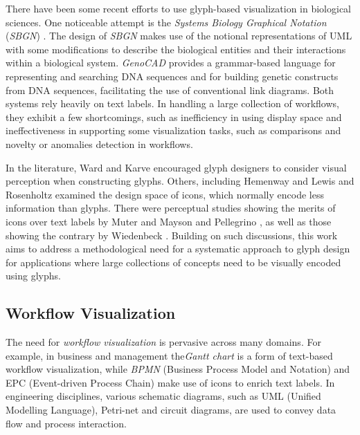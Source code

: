 There have been some recent efforts to use glyph-based visualization in biological sciences.
One noticeable attempt is the \emph{Systems Biology Graphical Notation} (\emph{SBGN}) \cite{lenovere09}.
The design of \emph{SBGN} makes use of the notional representations of UML with some modifications to describe the biological entities and their interactions within a biological system.
\emph{GenoCAD} \cite{cai10} provides a grammar-based language for representing and searching DNA sequences and for building genetic constructs from DNA sequences, facilitating the use of conventional link diagrams.
Both systems rely heavily on text labels.
In handling a large collection of workflows, they exhibit a few shortcomings, such as inefficiency in using display space and ineffectiveness in supporting some visualization tasks, such as comparisons and novelty or anomalies detection in workflows.

In the literature, Ward \cite{ward08} and Karve \cite{Karve07} encouraged glyph designers to consider visual perception when constructing glyphs.
Others, including Hemenway \cite{hemenway82} and Lewis and Rosenholtz \cite{lewis04} examined the design space of icons, which normally encode less information than glyphs.
There were perceptual studies showing the merits of icons over text labels by Muter and Mayson \cite{muter86} and Pellegrino \etal \cite{pellegrino77}, as well as those showing the contrary by Wiedenbeck \cite{wiedenbeck99}.
Building on such discussions, this work aims to address a methodological need for a systematic approach to glyph design for applications where large collections of concepts need to be visually encoded using glyphs.


\subsection{Workflow Visualization}
%
The need for \emph{workflow visualization} is pervasive across many domains.
For example, in business and management the\emph{Gantt chart} is a form of text-based workflow visualization, while \emph{BPMN} (Business Process Model and Notation) and EPC (Event-driven Process Chain) make use of icons to enrich text labels.
In engineering disciplines, various schematic diagrams, such as UML (Unified Modelling Language), Petri-net and circuit diagrams, are used to convey data flow and process interaction.

